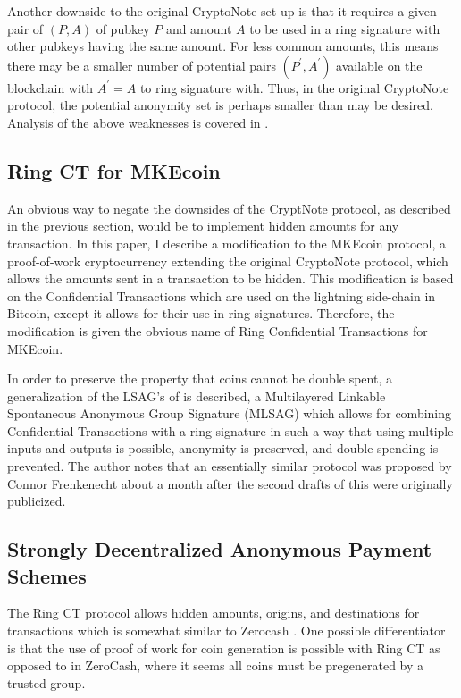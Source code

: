 \documentclass[12pt,oneside,english]{amsart}
\numberwithin{equation}{section}
\numberwithin{figure}{section}
\theoremstyle{plain}
\theoremstyle{plain}
\theoremstyle{remark}
\theoremstyle{plain}
\theoremstyle{remark}
\theoremstyle{remark}
\theoremstyle{plain}
\theoremstyle{definition}
\begin{document}
Another downside to the original CryptoNote set-up is that it requires a given
pair of $\left(P,A\right)$ of pubkey $P$ and amount $A$ to be used in a ring
signature with other pubkeys having the same amount. For less common
amounts, this means there may be a smaller number of potential pairs
$\left(P^{\prime},A^{\prime}\right)$ available on the blockchain
with $A^{\prime}=A$ to ring signature with. Thus, in the original CryptoNote protocol, the potential anonymity set is perhaps smaller than may be desired. 
  Analysis of the above weaknesses is covered in \cite{mrl4}.


\subsection{Ring CT for MKEcoin}

An obvious way to negate the downsides of the CryptNote protocol, as described in the previous section, would be to implement hidden amounts for any transaction.
In this
paper, I describe a modification to the MKEcoin protocol, a proof-of-work
cryptocurrency extending the original CryptoNote protocol, which allows the amounts sent in
a transaction to be hidden. This modification is based on the Confidential
Transactions \cite{GM} which are used on the lightning side-chain
in Bitcoin, except it allows for their use in ring signatures. Therefore,
the modification is given the obvious name of Ring Confidential Transactions for MKEcoin. 

In order to preserve the property that coins cannot be double spent,
a generalization of the LSAG's of \cite{LWW} is described, a Multilayered Linkable
Spontaneous Anonymous Group Signature (MLSAG) which allows for combining
Confidential Transactions with a ring signature in such a way that
using multiple inputs and outputs is possible, anonymity is preserved,
and double-spending is prevented. The author notes that an essentially similar protocol was proposed by Connor Frenkenecht about a month after the second drafts of this were originally publicized. 
\subsection{Strongly Decentralized Anonymous Payment Schemes}
The Ring CT protocol allows hidden amounts, origins, and destinations
for transactions which is somewhat similar to Zerocash \cite{Z}. 
One possible differentiator is that the use of proof of work for coin generation
is possible with Ring CT as opposed to in ZeroCash, where it seems all coins
must be pregenerated by a trusted group.
\end{document}
